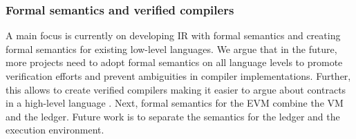 %
%

\subsubsection{Formal semantics and verified compilers}
A main focus is currently on developing IR with formal semantics and creating formal semantics for existing low-level languages. We argue that in the future, more projects need to adopt formal semantics on all language levels to promote verification efforts and prevent ambiguities in compiler implementations. Further, this allows to create verified compilers making it easier to argue about contracts in a high-level language \cite{Hirai2017}. 
Next, formal semantics for the EVM combine the VM and the ledger. Future work is to separate the semantics for the ledger and the execution environment. 

